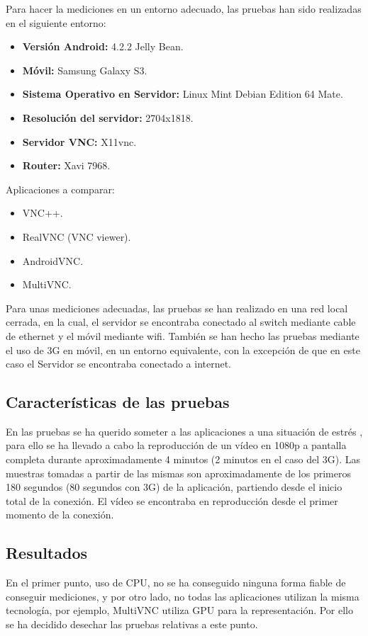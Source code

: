 Para hacer la mediciones en un entorno adecuado, las pruebas han sido realizadas en el siguiente entorno:
\begin{itemize}
\item \textbf{Versión Android:} 4.2.2 Jelly Bean.
\item \textbf{Móvil:} Samsung Galaxy S3.
\item \textbf{Sistema Operativo en Servidor:} Linux Mint Debian Edition 64 Mate.
\item \textbf{Resolución del servidor:} 2704x1818.
\item \textbf{Servidor VNC:} X11vnc.
\item \textbf{Router:} Xavi 7968.
\end{itemize}
\newpage
Aplicaciones a comparar:
\begin{itemize}
\item VNC++.
\item RealVNC (VNC viewer).
\item AndroidVNC.
\item MultiVNC.
\end{itemize}

Para unas mediciones adecuadas, las pruebas se han realizado en una red local cerrada, en la cual, el servidor se encontraba conectado al switch mediante cable de ethernet y el móvil mediante wifi. También se han hecho las pruebas mediante el uso de 3G en móvil, en un entorno equivalente, con la excepción de que en este caso el Servidor se encontraba conectado a internet.

\subsection{Características de las pruebas}

En las pruebas se ha querido someter a las aplicaciones a una situación de estrés , para ello se ha llevado a cabo la reproducción de un vídeo en 1080p a pantalla completa durante aproximadamente 4 minutos (2 minutos en el caso del 3G). Las muestras tomadas a partir de las mismas son aproximadamente de los primeros 180 segundos (80 segundos con 3G) de la aplicación, partiendo desde el inicio total de la conexión. El vídeo se encontraba en reproducción desde el primer momento de la conexión.

\subsection{Resultados}

En el primer punto, uso de CPU, no se ha conseguido ninguna forma fiable de conseguir mediciones, y por otro lado, no todas las aplicaciones utilizan la misma tecnología, por ejemplo, MultiVNC utiliza GPU para la representación. Por ello se ha decidido desechar las pruebas relativas a este punto.\\


